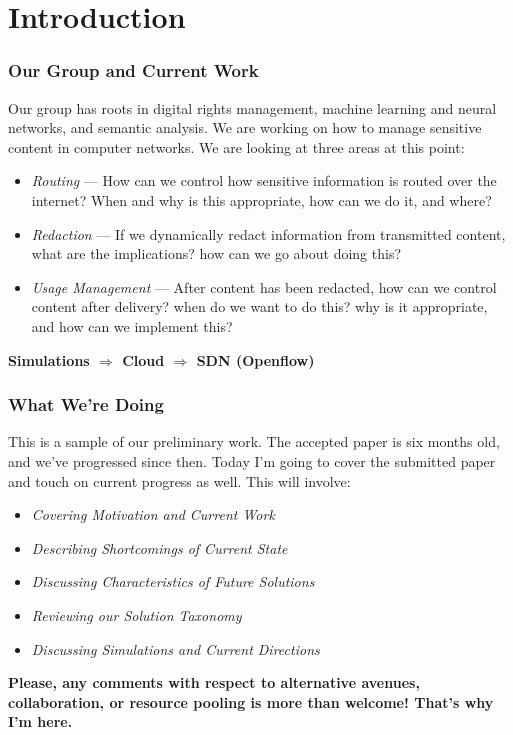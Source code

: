 \section{Introduction}

\begin{frame}
\frametitle{Our Group and Current Work}
Our group has roots in digital rights management, machine learning and neural networks, and semantic analysis.
\pause
\newline
\newline
We are working on how to manage sensitive content in computer networks.  We are looking at three areas at this point:
\pause
\begin{itemize}
\item \textit{Routing} --- How can we control how sensitive information is routed over the internet? When and why is this appropriate, how can we do it, and where?
\pause
\item \textit{Redaction} --- If we dynamically redact information from transmitted content, what are the implications? how can we go about doing this?
\pause
\item \textit{Usage Management} --- After content has been redacted, how can we control content after delivery? when do we want to do this? why is it appropriate, and how can we implement this?
\end{itemize}
\pause
\begin{center}
\textbf{Simulations $\Rightarrow$ Cloud $\Rightarrow$ SDN (Openflow)}
\end{center}
\end{frame}

\begin{frame}
\frametitle{What We're Doing}
This is a sample of our preliminary work.  The accepted paper is six months old, and we've progressed since then.
\pause
\newline
\newline
Today I'm going to cover the submitted paper and touch on current progress as well.  This will involve:
\pause
\begin{itemize}
\item \textit{Covering Motivation and Current Work}
\pause
\item \textit{Describing Shortcomings of Current State}
\pause
\item \textit{Discussing Characteristics of Future Solutions}
\pause
\item \textit{Reviewing our Solution Taxonomy}
\pause
\item \textit{Discussing Simulations and Current Directions}
\end{itemize}
\begin{center}
\pause
\textbf{Please, any comments with respect to alternative avenues, collaboration, or resource pooling is more than welcome! That's why I'm here.}
\end{center}
\end{frame}

